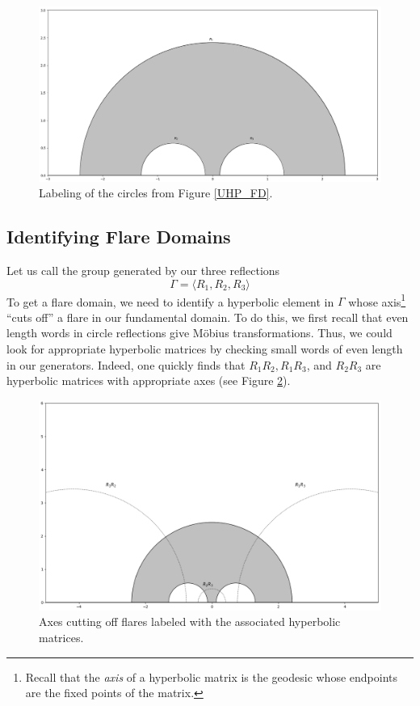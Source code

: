 \documentclass[]{article}
\begin{document}
\begin{figure}[h]
	\centering
	\includegraphics[width=0.6\linewidth]{UHP_labeled.png}
	\caption{Labeling of the circles from Figure \ref{UHP_FD}.}
	\label{UHP_labeled}
\end{figure}

\subsection*{Identifying Flare Domains}

Let us call the group generated by our three reflections
$$
\Gamma = \langle R_1, R_2, R_3 \rangle
$$
To get a flare domain, we need to identify a hyperbolic element in $\Gamma$ whose axis\footnote{Recall that the \textit{axis} of a hyperbolic matrix is the geodesic whose endpoints are the fixed points of the matrix.} ``cuts off'' a flare in our fundamental domain.
To do this, we first recall that even length words in circle reflections give M\"obius transformations.
Thus, we could look for appropriate hyperbolic matrices by checking small words of even length in our generators.
Indeed, one quickly finds that $R_1R_2, R_1R_3$, and $R_2R_3$ are hyperbolic matrices with appropriate axes (see Figure \ref{UHP_flares}).

\begin{figure}[h]
	\centering
	\includegraphics[width=0.6\linewidth]{UHP_flares.png}
	\caption{Axes cutting off flares labeled with the associated hyperbolic matrices.}
	\label{UHP_flares}
\end{figure}
\end{document}
